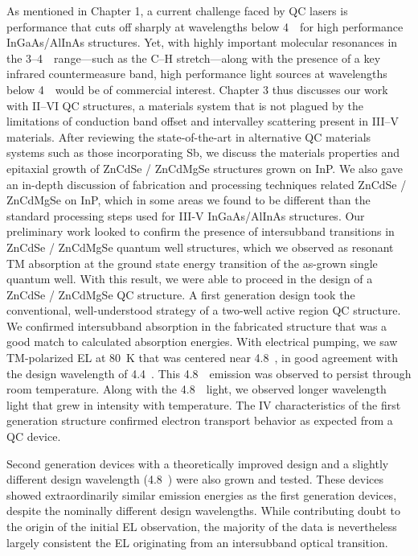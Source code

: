 As mentioned in Chapter 1, a current challenge faced by QC lasers is performance that cuts off sharply at wavelengths below 4~\um\ for high performance InGaAs/AlInAs structures.  Yet, with highly important molecular resonances in the 3--4~\um\ range---such as the C--H stretch---along with the presence of a key infrared countermeasure band, high performance light sources at wavelengths below 4~\um\ would be of commercial interest.  Chapter 3 thus discusses our work with II--VI QC structures, a materials system that is not plagued by the limitations of conduction band offset and intervalley scattering present in III--V materials.
After reviewing the state-of-the-art in alternative QC materials systems such as those incorporating Sb, we discuss the materials properties and epitaxial growth of ZnCdSe / ZnCdMgSe structures grown on InP.  We also gave an in-depth discussion of fabrication and processing techniques related ZnCdSe / ZnCdMgSe on InP, which in some areas we found to be different than the standard processing steps used for III-V InGaAs/AlInAs structures.  Our preliminary work looked to confirm the presence of intersubband transitions in ZnCdSe / ZnCdMgSe quantum well structures, which we observed as resonant TM absorption at the ground state energy transition of the as-grown single quantum well.  With this result, we were able to proceed in the design of a ZnCdSe / ZnCdMgSe QC structure.  A first generation design took the conventional, well-understood strategy of a two-well active region QC structure.  We confirmed intersubband absorption in the fabricated structure that was a good match to calculated absorption energies.  With electrical pumping, we saw TM-polarized EL at 80~K that was centered near 4.8~\um, in good agreement with the design wavelength of 4.4~\um.  This 4.8~\um\ emission was observed to persist through room temperature.  Along with the 4.8~\um\ light, we observed longer wavelength light that grew in intensity with temperature.  The IV characteristics of the first generation structure confirmed electron transport behavior as expected from a QC device.

Second generation devices with a theoretically improved design and a slightly different design wavelength (4.8~\um) were also grown and tested.  These devices showed extraordinarily similar emission energies as the first generation devices, despite the nominally different design wavelengths.  While contributing doubt to the origin of the initial EL observation, the majority of the data is nevertheless largely consistent the EL originating from an intersubband optical transition.

